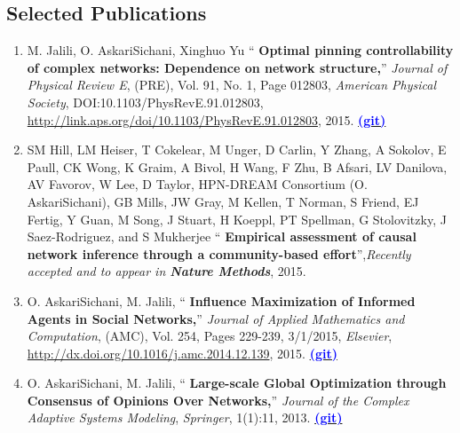 \documentclass[letter]{res}
\begin{document}
\begin{resume}
\section{Selected Publications}
\begin{enumerate}
\item M. Jalili, O. AskariSichani, Xinghuo Yu `` \textbf{Optimal pinning controllability of complex networks: Dependence on network structure,}''
\textit{Journal of Physical Review E}, (PRE), Vol. 91, No. 1, Page 012803,
\textit{American Physical Society}, DOI:10.1103/PhysRevE.91.012803,\\
\href{http://link.aps.org/doi/10.1103/PhysRevE.91.012803}{http://link.aps.org/doi/10.1103/PhysRevE.91.012803}, 2015.
{\href{https://github.com/omid55/optimal_pinning_control}{\textbf{\textcolor{blue}{(git)}}}}

\item SM Hill, LM Heiser, T Cokelear, M Unger, D Carlin, Y Zhang, A Sokolov, E Paull, CK Wong, K Graim, A Bivol, H Wang, F Zhu, B Afsari, LV Danilova, AV Favorov, W Lee, D Taylor, HPN-DREAM Consortium (O. AskariSichani), GB Mills, JW Gray, M Kellen, T Norman, S Friend, EJ Fertig, Y Guan, M Song, J Stuart, H Koeppl, PT Spellman, G Stolovitzky, J Saez-Rodriguez, and S Mukherjee `` \textbf{Empirical assessment of causal network inference through a community-based effort}'',\textit{Recently accepted and to appear in \textbf{Nature Methods}}, 2015.

\item O. AskariSichani, M. Jalili, `` \textbf{Influence Maximization of
Informed Agents in Social Networks,}'' \textit{Journal of Applied Mathematics
and Computation}, (AMC), Vol. 254, Pages 229-239, 3/1/2015, \textit{Elsevier},
\href{http://dx.doi.org/10.1016/j.amc.2014.12.139}{http://dx.doi.org/10.1016/j.amc.2014.12.139},%
2015.
{\href{https://github.com/omid55/influence_maximization}{\textbf{\textcolor{blue}{(git)}}}}

\item O. AskariSichani, M. Jalili, `` \textbf{Large-scale Global
Optimization through Consensus of Opinions Over Networks,}'' \textit{Journal of the Complex Adaptive Systems Modeling}, \textit{Springer}, 1(1):11, 2013.
{\href{https://github.com/omid55/optimization_opinion_formation}{\textbf{\textcolor{blue}{(git)}}}}



\end{enumerate}
\end{resume}
\end{document}
